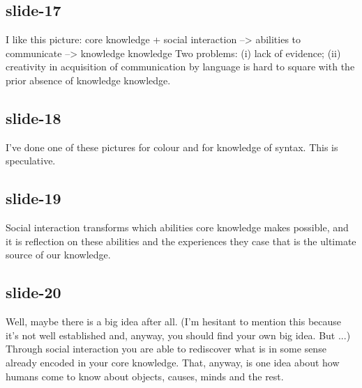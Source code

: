 \documentclass[12pt,\papersize]{extarticle}
\begin{document}
 
\subsection{slide-17}
I like this picture:
core knowledge + social interaction --> abilities to communicate --> knowledge knowledge
Two problems: (i) lack of evidence; (ii) creativity in acquisition of communication by language is hard to square with the prior absence of knowledge knowledge.
 
 
\subsection{slide-18}
I've done one of these pictures for colour and for knowledge of syntax.
This is speculative.
 
 
\subsection{slide-19}
Social interaction transforms which abilities core knowledge makes possible, and it is reflection on these abilities and the experiences they case that is the ultimate source of our knowledge.
 
 
\subsection{slide-20}
Well, maybe there is a big idea after all.
(I'm hesitant to mention this because it's not well established and, anyway, you should find your own big idea. But ...)
Through social interaction you are able to rediscover what is in some sense already encoded in your core knowledge.
That, anyway, is one idea about how humans come to know about objects, causes, minds and the rest.


 






\end{document}
